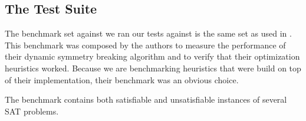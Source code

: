 \subsection{The Test Suite}
\label{ssec:benchmark}
	The benchmark set against we ran our tests against is the same set as used in
	\cite{devriendt2012symmetry}.
	This benchmark was composed by the authors to measure the performance of their dynamic symmetry
	breaking algorithm and to verify that their optimization heuristics worked.
	Because we are benchmarking heuristics that were build on top of their implementation, their
	benchmark was an obvious choice.

	The benchmark contains both satisfiable and unsatisfiable instances of several SAT problems.
